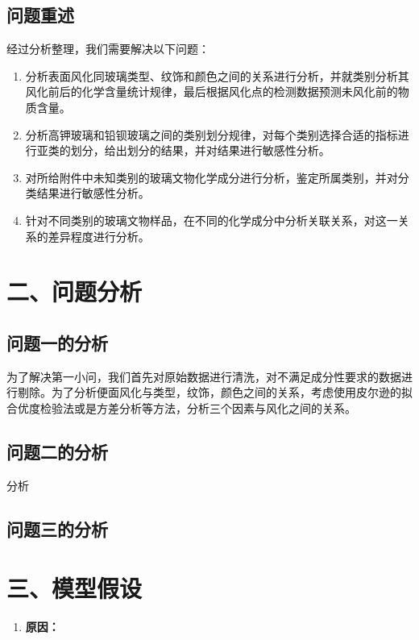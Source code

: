 \documentclass{my_paper}
\begin{document}
\subsection{问题重述}
经过分析整理，我们需要解决以下问题：
\begin{enumerate}
    \item 分析表面风化同玻璃类型、纹饰和颜色之间的关系进行分析，并就类别分析其风化前后的化学含量统计规律，最后根据风化点的检测数据预测未风化前的物质含量。
    \item 分析高钾玻璃和铅钡玻璃之间的类别划分规律，对每个类别选择合适的指标进行亚类的划分，给出划分的结果，并对结果进行敏感性分析。
    \item 对所给附件中未知类别的玻璃文物化学成分进行分析，鉴定所属类别，并对分类结果进行敏感性分析。
    \item 针对不同类别的玻璃文物样品，在不同的化学成分中分析关联关系，对这一关系的差异程度进行分析。
\end{enumerate}
\section{二、问题分析}
\subsection{问题一的分析}

为了解决第一小问，我们首先对原始数据进行清洗，对不满足成分性要求的数据进行剔除。为了分析便面风化与类型，纹饰，颜色之间的关系，考虑使用皮尔逊的拟合优度检验法\cite{1}或是方差分析\cite{2}等方法，分析三个因素与风化之间的关系。

\subsection{问题二的分析}

分析

\subsection{问题三的分析}


\section{三、模型假设}
\begin{enumerate}
    \item 
    
    \textbf{原因：}


\end{enumerate}
\end{document}
